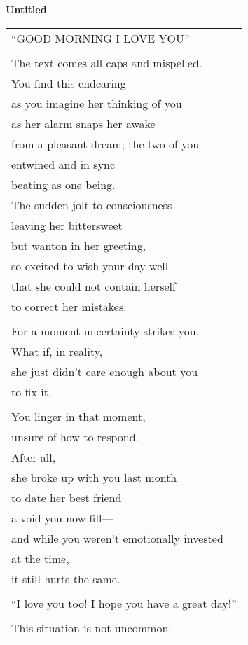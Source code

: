 \documentclass{article}
\begin{document}
\newcommand{\h}{\hspace*{4ex}}

\begin{center}
\textbf{Untitled} \\
\vspace*{2ex}
\begin{longtable}{l}
``GOOD MORNING I LOVE YOU'' \\
\\
The text comes all caps and mispelled. \\
You find this endearing \\
as you imagine her thinking of you \\
as her alarm snaps her awake \\
from a pleasant dream; the two of you \\
entwined and in sync \\
beating as one being. \\
The sudden jolt to consciousness \\
leaving her bittersweet \\
but wanton in her greeting, \\
so excited to wish your day well \\
that she could not contain herself \\
to correct her mistakes. \\
\\
For a moment uncertainty strikes you. \\
What if, in reality, \\
she just didn't care enough about you \\
to fix it. \\
\\
You linger in that moment, \\
unsure of how to respond. \\
After all, \\
she broke up with you last month \\
to date her best friend--- \\
a void you now fill--- \\
and while you weren't emotionally invested \\
at the time, \\
it still hurts the same. \\
\\
``I love you too! I hope you have a great day!'' \\
\\
This situation is not uncommon. \\

\end{longtable}
\end{center}
\end{document}
